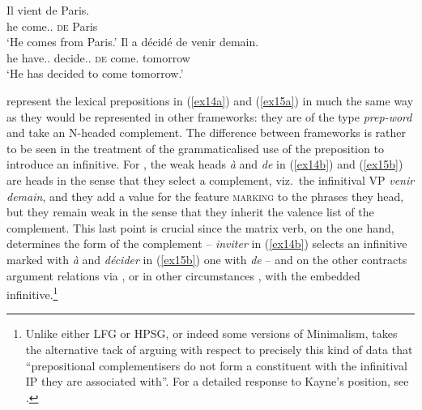 \documentclass[output=paper]{langsci/langscibook}
\begin{document}
\begin{exe}
\ex\label{ex15} 
\begin{xlist}
\ex\label{ex15a}
\gll Il	vient de Paris.\\	he come.\Prs.\Tsg{} \textsc{de} Paris\\\trans \enquote*{He comes from Paris.}
\ex\label{ex15b}
\gll Il a d\'ecid\'e de venir demain.\\	he have.\Prs.\Tsg{} decide.\Pst.\Ptcp{} \textsc{de} come.\Inf{} tomorrow\\\trans \enquote*{He has decided to come tomorrow.}\end{xlist}
\end{exe}

\citeauthor{Abeilleetal06} represent the lexical prepositions in (\ref{ex14a})
and (\ref{ex15a}) in much the same way as they would be represented in other
frameworks: they are of the type \emph{prep-word} and take an N-headed
complement. The difference between frameworks is rather to be seen in the
treatment of the grammaticalised use of the preposition to introduce an
infinitive. For \citeauthor{Abeilleetal06}, the weak heads \emph{\`a} and
\emph{de} in (\ref{ex14b}) and (\ref{ex15b}) are  heads in the sense that they
select a complement, viz.\ the infinitival VP \emph{venir demain}, and they add a
value for the feature \textsc{marking} to the phrases they head, but they remain
weak in the sense that they inherit the valence list of the complement. This
last point is crucial since the matrix verb, on the one hand, determines the
form of the complement -- \emph{inviter} in (\ref{ex14b}) selects an infinitive
marked with \emph{\`a} and \emph{d\'ecider} in (\ref{ex15b}) one with \emph{de}
-- and on the other contracts argument relations via , or in other
circumstances , with the embedded infinitive.\footnote{Unlike
    either \gls{LFG} or \gls{HPSG}, or indeed
    some versions of Minimalism, \cite[50]{Kayne99} takes the alternative tack
    of arguing with respect to precisely this kind of  data that
``prepositional complementisers do not form a constituent
with the infinitival IP they are associated with''. For a detailed response to
Kayne's position, see \cite{Borsley01}.}
\end{document}
